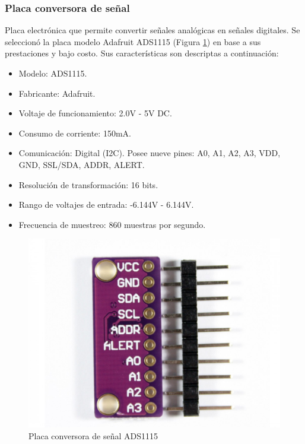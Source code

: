        \subsubsection{Placa conversora de señal}
        
        \par Placa electrónica que permite convertir señales analógicas en señales digitales. Se seleccionó la placa modelo Adafruit ADS1115 (Figura \ref{ADS1115}) en base a sus prestaciones y bajo costo.
        Sus características son descriptas a continuación:
        \begin{itemize}
                    \item Modelo: ADS1115.
                    \item Fabricante: Adafruit.
                    \item Voltaje de funcionamiento: 2.0V - 5V DC.
                    \item Consumo de corriente: 150mA.
                    \item Comunicación: Digital (I2C). Posee nueve pines: A0, A1, A2, A3, VDD, GND, SSL/SDA, ADDR, ALERT.
                    \item Resolución de transformación: 16 bits.
                    \item Rango de voltajes de entrada: -6.144V - 6.144V.
                    \item Frecuencia de muestreo: 860 muestras por segundo. 
        \end{itemize}
        
        \begin{figure} [h]
            \centering            \includegraphics[scale=0.2]{hardware/ADS1115.jpg}
            \caption{Placa conversora de señal ADS1115}
            \label{ADS1115}
        \end{figure}
        
